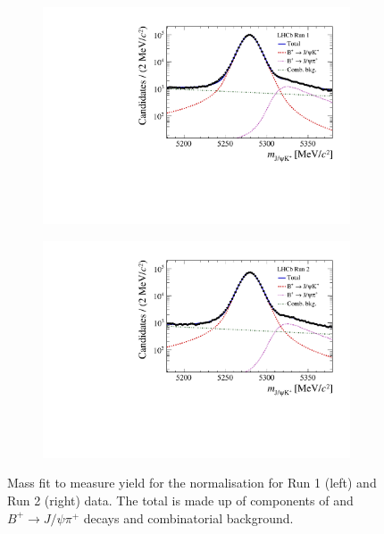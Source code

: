 {{\begin{figure}[tbp]
    \centering
   \begin{subfigure}[b]{0.48\textwidth}
        \includegraphics[width=  \textwidth]{./Figs/BFAnalysis/BuJpsiK_Run1.pdf}
    \end{subfigure}
    \begin{subfigure}[b]{0.48\textwidth}
       \includegraphics[width=\textwidth]{./Figs/BFAnalysis/BuJpsiK_Run2.pdf}
   \end{subfigure}
    \caption{ Mass fit to measure \bujpsik yield for the normalisation for Run 1 (left) and Run 2 (right) data. The total \pdf is made up of components of \bujpsik and $B^{+} \to J/\psi \pi^{+}$ decays and combinatorial background.}

\end{figure}}}
